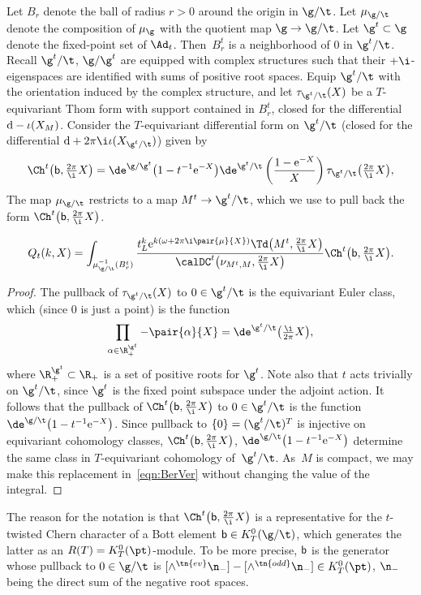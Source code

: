 Let $B_r$ denote the ball of radius $r>0$ around the origin in $\g/\t$. Let $\mu_{\g/\t}$ denote the composition of $\mu_\g$ with the quotient map $\g \rightarrow \g/\t$. Let $\g^t \subset \g$ denote the fixed-point set of $\Ad_t$. Then~$B_r^t$ is a neighborhood of $0$ in $\g^t/\t$. Recall $\g^t/\t$, $\g/\g^t$ are equipped with complex structures such that their $+\i$-eigenspaces are identified with sums of positive root spaces. Equip $\g^t/\t$ with the orientation induced by the complex structure, and let $\tau_{\g^t/\t}(X)$ be a $T$-equivariant Thom form with support contained in $B_r^t$, closed for the differential ${\rm d}-\iota(X_M)$. Consider the $T$-equivariant differential form on $\g^t/\t$ (closed for the differential ${\rm d}+2\pi \i \iota(X_{\g^t/\t})$) given by
\[ \Ch^t\big({\sf b},\tfrac{2\pi}{\i}X\big)=\de^{\g/\g^t}\big(1-t^{-1}{\rm e}^{-X}\big)\de^{\g^t/\t}\left(\frac{1-{\rm e}^{-X}}{X}\right)\tau_{\g^t/\t}\big(\tfrac{2\pi}{\i}X\big),\]
The map $\mu_{\g/\t}$ restricts to a map $M^t \rightarrow \g^t/\t$, which we use to pull back the form $\Ch^t\big({\sf b},\tfrac{2\pi}{\i}X\big)$.
\begin{Lemma}
\begin{gather}\label{eqn:Qg}
Q_t(k,X)=\int_{\mu_{\g/\t}^{-1}(B_r^t)} \frac{t_L^k {\rm e}^{k(\omega+2\pi \i\pair{\mu}{X})}\Td\big(M^t,\tfrac{2\pi}{\i}X\big)}{\calDC^t\big(\nu_{M^t,M},\tfrac{2\pi}{\i}X\big)}\Ch^t\big({\sf b},\tfrac{2\pi}{\i}X\big).
\end{gather}
\end{Lemma}
\begin{proof}The pullback of $\tau_{\g^t/\t}(X)$ to $0 \in \g^t/\t$ is the equivariant Euler class, which (since $0$ is just a point) is the function
\[ \prod_{\alpha \in \R^{\g^t}_+} -\pair{\alpha}{X}=\de^{\g^t/\t}\big(\tfrac{\i}{2\pi}X\big),\]
where $\R^{\g^t}_+\subset \R_+$ is a set of positive roots for $\g^t$. Note also that $t$ acts trivially on $\g^t/\t$, since $\g^t$ is the fixed point subspace under the adjoint action. It follows that the pullback of $\Ch^t\big({\sf b},\tfrac{2\pi}{\i}X\big)$ to $0 \in \g^t/\t$ is the function $\de^{\g/\t}\big(1-t^{-1}{\rm e}^{-X}\big)$. Since pullback to $\{0\}=(\g^t/\t)^T$ is injective on equivariant cohomology classes, $\Ch^t\big({\sf b},\tfrac{2\pi}{\i}X\big)$, $\de^{\g/\t}\big(1-t^{-1}{\rm e}^{-X}\big)$ determine the same class in $T$-equivariant cohomology of~$\g^t/\t$. As~$M$ is compact, we may make this replacement in~\eqref{eqn:BerVer} without changing the value of the integral.
\end{proof}
\begin{Remark}
The reason for the notation is that $\Ch^t\big({\sf b},\tfrac{2\pi}{\i}X\big)$ is a representative for the $t$-twisted Chern character of a Bott element ${\sf b} \in K_T^0(\g/\t)$, which generates the latter as an $R(T)=K_T^0(\pt)$-module. To be more precise, ${\sf b}$ is the generator whose pullback to $0 \in \g/\t$ is $[\wedge^{\tn{ev}} \n_-]-[\wedge^{\tn{odd}}\n_-] \in K^0_T(\pt)$, $\n_-$ being the direct sum of the negative root spaces.
\end{Remark}

